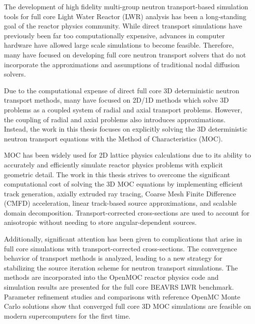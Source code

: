 \begin{abstractpage}

The development of high fidelity multi-group neutron transport-based simulation tools for full core Light Water Reactor (LWR) analysis has been a long-standing goal of the reactor physics community. While direct transport simulations have previously been far too computationally expensive, advances in computer hardware have allowed large scale simulations to become feasible. Therefore, many have focused on developing full core neutron transport solvers that do not incorporate the approximations and assumptions of traditional nodal diffusion solvers. 

Due to the computational expense of direct full core 3D deterministic neutron transport methods, many have focused on 2D/1D methods which solve 3D problems as a coupled system of radial and axial transport problems. However, the coupling of radial and axial problems also introduces approximations. Instead, the work in this thesis focuses on explicitly solving the 3D deterministic neutron transport equations with the Method of Characteristics (MOC).

MOC has been widely used for 2D lattice physics calculations due to its ability to accurately and efficiently simulate reactor physics problems with explicit geometric detail. The work in this thesis strives to overcome the significant computational cost of solving the 3D MOC equations by implementing efficient track generation, axially extruded ray tracing, Coarse Mesh Finite Difference (CMFD) acceleration, linear track-based source approximations, and scalable domain decomposition. Transport-corrected cross-sections are used to account for anisotropic without needing to store angular-dependent sources.

Additionally, significant attention has been given to complications that arise in full core simulations with transport-corrected cross-sections. The convergence behavior of transport methods is analyzed, leading to a new strategy for stabilizing the source iteration scheme for neutron transport simulations. The methods are incorporated into the OpenMOC reactor physics code and simulation results are presented for the full core BEAVRS LWR benchmark. Parameter refinement studies and comparisons with reference OpenMC Monte Carlo solutions show that converged full core 3D MOC simulations are feasible on modern supercomputers for the first time.



\end{abstractpage}
